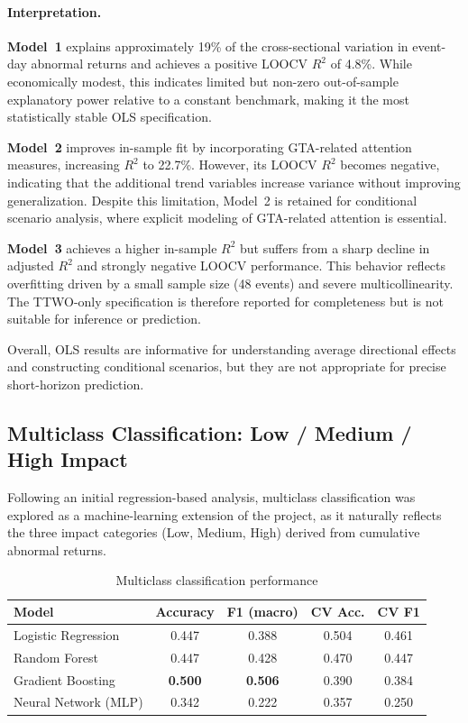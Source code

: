 \documentclass[11pt,a4paper]{article}
\begin{document}
\paragraph{Interpretation.}

\textbf{Model~1} explains approximately 19\% of the cross-sectional variation in event-day abnormal returns and achieves a positive LOOCV $R^2$ of 4.8\%. While economically modest, this indicates limited but non-zero out-of-sample explanatory power relative to a constant benchmark, making it the most statistically stable OLS specification.

\textbf{Model~2} improves in-sample fit by incorporating GTA-related attention measures, increasing $R^2$ to 22.7\%. However, its LOOCV $R^2$ becomes negative, indicating that the additional trend variables increase variance without improving generalization. Despite this limitation, Model~2 is retained for conditional scenario analysis, where explicit modeling of GTA-related attention is essential.

\textbf{Model~3} achieves a higher in-sample $R^2$ but suffers from a sharp decline in adjusted $R^2$ and strongly negative LOOCV performance. This behavior reflects overfitting driven by a small sample size (48 events) and severe multicollinearity. The TTWO-only specification is therefore reported for completeness but is not suitable for inference or prediction.

Overall, OLS results are informative for understanding average directional effects and constructing conditional scenarios, but they are not appropriate for precise short-horizon prediction.

\subsection{Multiclass Classification: Low / Medium / High Impact}

Following an initial regression-based analysis, multiclass classification was explored as a machine-learning extension of the project, as it naturally reflects the three impact categories (Low, Medium, High) derived from cumulative abnormal returns.

\begin{table}[H]
\centering
\caption{Multiclass classification performance}
\begin{tabular}{lcccc}
\hline
Model & Accuracy & F1 (macro) & CV Acc. & CV F1 \\
\hline
Logistic Regression & 0.447 & 0.388 & 0.504 & 0.461 \\
Random Forest & 0.447 & 0.428 & 0.470 & 0.447 \\
Gradient Boosting & \textbf{0.500} & \textbf{0.506} & 0.390 & 0.384 \\
Neural Network (MLP) & 0.342 & 0.222 & 0.357 & 0.250 \\
\hline
\end{tabular}
\label{tab:multiclass_results}
\end{table}
\end{document}
